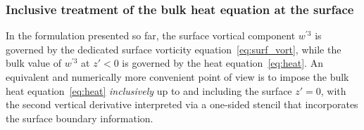 \documentclass{article}
\begin{document}
\subsubsection{Inclusive treatment of the bulk heat equation at the surface}
\label{sec:inclusive_treatment}

In the formulation presented so far, the surface vortical component $w^{\prime 3}$ is governed by the dedicated surface vorticity equation~\eqref{eq:surf_vort}, while the bulk value of $w^{\prime 3}$ at $z' < 0$ is governed by the heat equation~\eqref{eq:heat}.
An equivalent and numerically more convenient point of view is to impose the bulk heat equation~\eqref{eq:heat} \emph{inclusively} up to and including the surface $z' = 0$, with the second vertical derivative interpreted via a one-sided stencil that incorporates the surface boundary information.
\end{document}

